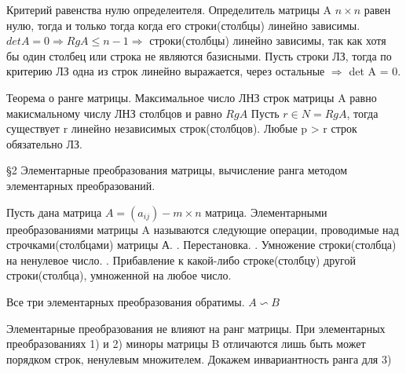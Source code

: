 \documentclass[12pt]{article}
\begin{document}
    Критерий равенства нулю определеителя. \newline
    Определитель матрицы A $n \times n$ равен нулю, тогда и только тогда когда его строки(столбцы) линейно зависимы. \newline
    $det A = 0 \Rightarrow Rg A \leq n - 1 \Rightarrow$ строки(столбцы) линейно зависимы, так как хотя бы один столбец или строка не являются базисными. \newline
    Пусть строки ЛЗ, тогда по критерию ЛЗ одна из строк линейно выражается, через остальные $\Rightarrow$ det A = 0. \newline

    Теорема о ранге матрицы. \newline
    Максимальное число ЛНЗ строк матрицы A равно макисмальному числу ЛНЗ столбцов и равно $Rg A$ \newline
    Пусть $r \in N = Rg A$, тогда существует r линейно независимых строк(столбцов). \newline
    Любые p > r строк обязательно ЛЗ. \newline


    \S2 Элементарные преобразования матрицы, вычисление ранга методом элементарных преобразований. \newline

    Пусть дана матрица $A = (a_{ij}) - m \times n$ матрица. \newline
    Элементарными преобразованиями матрицы A называются следующие операции, проводимые над строчками(столбцами) матрицы А. . Перестановка. . Умножение строки(столбца) на ненулевое число. . Прибавление к какой-либо строке(столбцу) другой строки(столбца), умноженной на любое число. \newline

    Все три элементарных преобразования обратимы. \newline
    $A \backsim  B$ \newline

    Элементарные преобразования не влияют на ранг матрицы. \newline
    При элементарных преобразованиях 1) и 2) миноры матрицы B отличаются лишь быть может порядком строк, ненулевым множителем. \newline
    Докажем инвариантность ранга для 3) \newline
\end{document}
